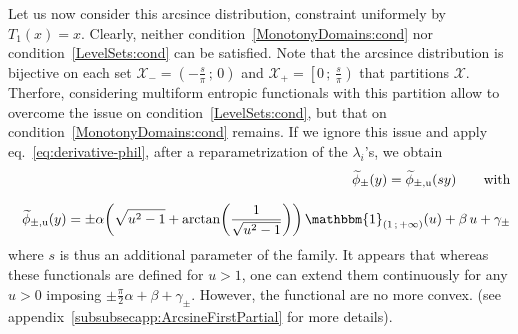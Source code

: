 \documentclass[entropy,article,submit,moreauthors,pdftex]{Definitions/mdpi}
\newcommand{\SZ}[1]{{\color{blue} #1}}                                       %
\def\X{\mathcal{X}}%
\def\un{\mathbbm{1}}%
\def\u{\mathrm{u}}
\begin{document}
\SZ{
\begin{Example}\label{arcsineUni:ex}
  Let  us now  consider  this arcsince  distribution,  constraint uniformely  by
  $T_1(x)  =  x$.   Clearly,  neither  condition~\ref{MonotonyDomains:cond}  nor
  condition~\ref{LevelSets:cond}  can  be  satisfied.  Note  that  the  arcsince
  distribution is bijective on each set $\X_- = \left( - \frac{s}{\pi} \, ; \, 0
  \right)$ and $\X_+  = \left[ 0 \, ; \,  \frac{s}{\pi} \right)$ that partitions
    $\X$.   Therfore,  considering  multiform  entropic  functionals  with  this
    partition allow to overcome the issue on condition~\ref{LevelSets:cond}, but
    that on condition~\ref{MonotonyDomains:cond} remains.
  If  we ignore  this issue  and apply  eq.~\eqref{eq:derivative-phil}, after  a
  reparametrization of the $\lambda_i$'s, we obtain
   \begin{eqnarray*}
     &&\widetilde{\phi}_\pm(y) =  \widetilde{\phi}_{\pm,\u}(s y)\qquad \mbox{with}
     \\[2.5mm]
     && \widetilde{\phi}_{\pm,\u}(y) = \pm \alpha  \left( \sqrt{u^2 -
    1} + \arctan\left( \frac{1}{\sqrt{u^2 - 1}} \right) \right)
  \, \un_{(  1 \, ;  \, +\infty )}(u)  + \beta \,  u +
  \gamma_\pm
  \end{eqnarray*}
   where $s$  is thus an  additional parameter of  the family.  It  appears that
   whereas  these functionals  are defined  for  $u >  1$, one  can extend  them
   continuously for  any $u >  0$ imposing $\pm  \frac{\pi}{2} \alpha +  \beta +
   \gamma_\pm$.    However,   the  functional   are   no   more  convex.    (see
   appendix~\ref{subsubsecapp:ArcsineFirstPartial} for more details).
\end{Example}


}
\end{document}
